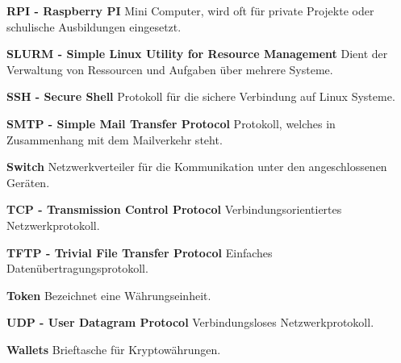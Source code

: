 \textbf{RPI - Raspberry PI}\newline
Mini Computer, wird oft für private Projekte oder schulische Ausbildungen eingesetzt.

\textbf{SLURM - Simple Linux Utility for Resource Management}\newline
Dient der Verwaltung von Ressourcen und Aufgaben über mehrere Systeme.

\textbf{SSH - Secure Shell}\newline
Protokoll für die sichere Verbindung auf Linux Systeme.

\textbf{SMTP - Simple Mail Transfer Protocol}\newline
Protokoll, welches in Zusammenhang mit dem Mailverkehr steht.

\textbf{Switch}\newline
Netzwerkverteiler für die Kommunikation unter den angeschlossenen Geräten.

\textbf{TCP - Transmission Control Protocol}\newline
Verbindungsorientiertes Netzwerkprotokoll.

\textbf{TFTP - Trivial File Transfer Protocol}\newline
Einfaches Datenübertragungsprotokoll.

\textbf{Token}\newline
Bezeichnet eine Währungseinheit.

\textbf{UDP - User Datagram Protocol}\newline
Verbindungsloses Netzwerkprotokoll.

\textbf{Wallets}\newline
Brieftasche für Kryptowährungen.



